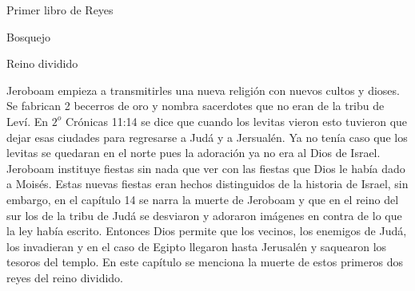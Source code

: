 \begin{section}{Primer libro de Reyes}
\begin{subsection}{Bosquejo}
\begin{subsubsection}{Reino dividido}
\begin{itemize}
					Jeroboam empieza a transmitirles una nueva religión con nuevos cultos y dioses. Se fabrican 2 becerros de oro y nombra sacerdotes que no eran de la tribu de Leví. En $2^{o}$ Crónicas 11:14 se dice que cuando los levitas vieron esto tuvieron que dejar esas ciudades para regresarse a Judá y a Jersualén. Ya no tenía caso que los levitas se quedaran en el norte pues la adoración ya no era al Dios de Israel. Jeroboam instituye fiestas sin nada que ver con las fiestas que Dios le había dado a Moisés. Estas nuevas fiestas eran hechos distinguidos de la historia de Israel, sin embargo, en el capítulo 14 se narra la muerte de Jeroboam  y que en el reino del sur los de la tribu de Judá se desviaron y adoraron imágenes en contra de lo que la ley había escrito. Entonces Dios permite que los vecinos, los enemigos de Judá, los invadieran y en el caso de Egipto llegaron hasta Jerusalén y saquearon los tesoros del templo. En este capítulo se menciona la muerte de estos primeros dos reyes del reino dividido.\\
		

\end{itemize}
\end{subsubsection}
\end{subsection}
\end{section}
